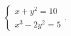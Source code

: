 $\displaystyle
\left\{
\begin{array}{l}
\displaystyle x + y^2 = 10 \\
\displaystyle x^3 - 2y^2 = 5
\end{array}
\right.
$.
